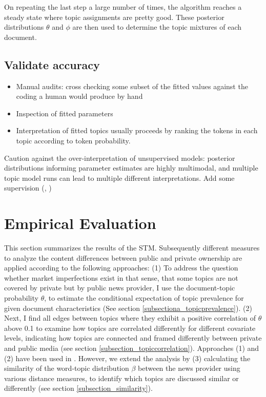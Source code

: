 \documentclass[12pt,a4paper,notitlepage]{article}
\begin{document}
{On repeating the last step a large number of times, the algorithm reaches a steady state where topic assignments are pretty good. These posterior distributions $\theta$ and $\phi$ are then used to determine the topic mixtures of each document.

\subsection{Validate accuracy}

\begin{itemize}
	\item Manual audits: cross checking some subset of the fitted values against the coding a human would produce by hand
	\item Inspection of fitted parameters
	\item Interpretation of fitted topics usually proceeds by ranking the tokens in each topic according to token probability.
\end{itemize}

Caution against the over-interpretation of unsupervised models: posterior distributions informing parameter estimates are highly multimodal, and multiple topic model runs can lead to multiple different interpretations. Add some supervision (\citet{airoldi_improving_2016}, \citet{gentzkow_text_2017})  

\section{Empirical Evaluation}\label{ch_empirical}

This section summarizes the results of the STM. Subsequently different measures to analyze the content differences between public and private ownership are applied according to the following approaches: (1) To address the question whether market imperfections exist in that sense, that some topics are not covered by private but by public news provider, I use the document-topic probability $\theta$, to estimate the conditional expectation of topic prevalence for given document characteristics (See section \ref{subsectiona_topicprevalence}). (2) Next, I find all edges between topics where they exhibit a positive correlation of $\theta$ above 0.1 to examine how topics are correlated differently for different covariate levels, indicating how topics are connected and framed differently between private and public media (see section \ref{subsection_topiccorrelation}). Approaches (1) and (2) have been used in \citep{roberts_model_2016}. However, we extend the analysis by (3) calculating the similarity of the word-topic distribution $\beta$ between the news provider using various distance measures, to identify which topics are discussed similar or differently (see section \ref{subsection_similarity}). 

}
\end{document}
